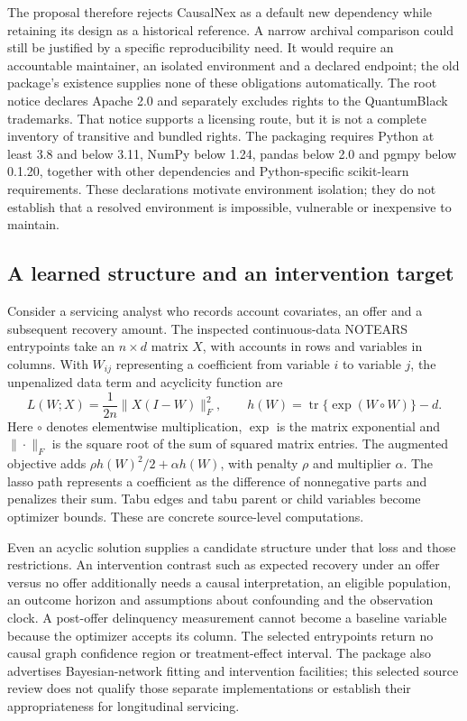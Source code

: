 The proposal therefore rejects CausalNex as a default new dependency while
retaining its design as a historical reference. A narrow archival comparison
could still be justified by a specific reproducibility need. It would require
an accountable maintainer, an isolated environment and a declared endpoint;
the old package's existence supplies none of these obligations automatically.
The root notice declares Apache 2.0 and separately excludes rights to the
QuantumBlack trademarks. That notice supports a licensing route, but it is
not a complete inventory of transitive and bundled rights. The packaging
requires Python at least 3.8 and below 3.11, NumPy below 1.24, pandas below 2.0
and pgmpy below 0.1.20, together with other dependencies and Python-specific
scikit-learn requirements. These declarations motivate environment isolation;
they do not establish that a resolved environment is impossible, vulnerable
or inexpensive to maintain.~\citep{exec14_causalnex_primary}

\subsection{A learned structure and an intervention target}

Consider a servicing analyst who records account covariates, an offer and a
subsequent recovery amount. The inspected continuous-data NOTEARS entrypoints
take an $n\times d$ matrix $X$, with accounts in rows and variables in columns.
With $W_{ij}$ representing a coefficient from variable $i$ to variable $j$,
the unpenalized data term and acyclicity function are
\[
 L(W;X)=\frac{1}{2n}\|X(I-W)\|_F^2,
 \qquad h(W)=\operatorname{tr}\{\exp(W\circ W)\}-d.
\]
Here $\circ$ denotes elementwise multiplication, $\exp$ is the matrix
exponential and $\|\cdot\|_F$ is the square root of the sum of squared matrix
entries. The augmented objective adds $\rho h(W)^2/2+\alpha h(W)$, with
penalty $\rho$ and multiplier $\alpha$. The lasso path represents a coefficient
as the difference of nonnegative parts and penalizes their sum. Tabu edges and
tabu parent or child variables become optimizer bounds. These are concrete
source-level computations.~\citep{exec14_causalnex_primary}

Even an acyclic solution supplies a candidate structure under that loss and
those restrictions. An intervention contrast such as expected recovery under
an offer versus no offer additionally needs a causal interpretation, an
eligible population, an outcome horizon and assumptions about confounding and
the observation clock. A post-offer delinquency measurement cannot become a
baseline variable because the optimizer accepts its column. The selected
entrypoints return no causal graph confidence region or treatment-effect
interval. The package also advertises Bayesian-network fitting and
intervention facilities; this selected source review does not qualify those
separate implementations or establish their appropriateness for longitudinal
servicing.~\citep{exec14_causalnex_primary}

